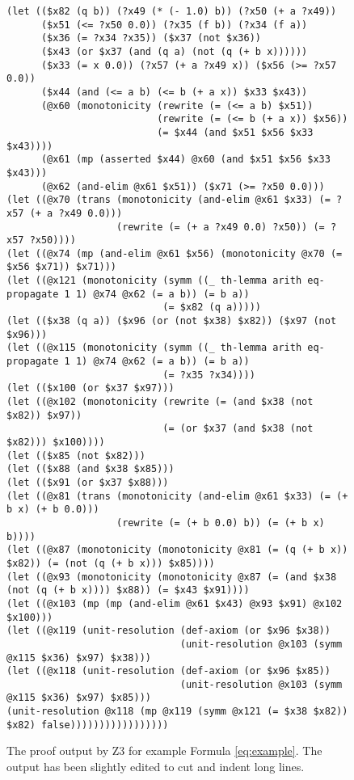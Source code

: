 \documentclass{llncs}
\begin{document}
\begin{figure}
{\scriptsize
\begin{verbatim}
(let (($x82 (q b)) (?x49 (* (- 1.0) b)) (?x50 (+ a ?x49))
      ($x51 (<= ?x50 0.0)) (?x35 (f b)) (?x34 (f a))
      ($x36 (= ?x34 ?x35)) ($x37 (not $x36))
      ($x43 (or $x37 (and (q a) (not (q (+ b x))))))
      ($x33 (= x 0.0)) (?x57 (+ a ?x49 x)) ($x56 (>= ?x57 0.0))
      ($x44 (and (<= a b) (<= b (+ a x)) $x33 $x43))
      (@x60 (monotonicity (rewrite (= (<= a b) $x51))
                          (rewrite (= (<= b (+ a x)) $x56))
                          (= $x44 (and $x51 $x56 $x33 $x43))))
      (@x61 (mp (asserted $x44) @x60 (and $x51 $x56 $x33 $x43)))
      (@x62 (and-elim @x61 $x51)) ($x71 (>= ?x50 0.0)))
(let ((@x70 (trans (monotonicity (and-elim @x61 $x33) (= ?x57 (+ a ?x49 0.0)))
                   (rewrite (= (+ a ?x49 0.0) ?x50)) (= ?x57 ?x50))))
(let ((@x74 (mp (and-elim @x61 $x56) (monotonicity @x70 (= $x56 $x71)) $x71)))
(let ((@x121 (monotonicity (symm ((_ th-lemma arith eq-propagate 1 1) @x74 @x62 (= a b)) (= b a))
                           (= $x82 (q a)))))
(let (($x38 (q a)) ($x96 (or (not $x38) $x82)) ($x97 (not $x96)))
(let ((@x115 (monotonicity (symm ((_ th-lemma arith eq-propagate 1 1) @x74 @x62 (= a b)) (= b a))
                           (= ?x35 ?x34))))
(let (($x100 (or $x37 $x97)))
(let ((@x102 (monotonicity (rewrite (= (and $x38 (not $x82)) $x97))
                           (= (or $x37 (and $x38 (not $x82))) $x100))))
(let (($x85 (not $x82)))
(let (($x88 (and $x38 $x85)))
(let (($x91 (or $x37 $x88)))
(let ((@x81 (trans (monotonicity (and-elim @x61 $x33) (= (+ b x) (+ b 0.0)))
                   (rewrite (= (+ b 0.0) b)) (= (+ b x) b))))
(let ((@x87 (monotonicity (monotonicity @x81 (= (q (+ b x)) $x82)) (= (not (q (+ b x))) $x85))))
(let ((@x93 (monotonicity (monotonicity @x87 (= (and $x38 (not (q (+ b x)))) $x88)) (= $x43 $x91))))
(let ((@x103 (mp (mp (and-elim @x61 $x43) @x93 $x91) @x102 $x100)))
(let ((@x119 (unit-resolution (def-axiom (or $x96 $x38))
                              (unit-resolution @x103 (symm @x115 $x36) $x97) $x38)))
(let ((@x118 (unit-resolution (def-axiom (or $x96 $x85))
                              (unit-resolution @x103 (symm @x115 $x36) $x97) $x85)))
(unit-resolution @x118 (mp @x119 (symm @x121 (= $x38 $x82)) $x82) false)))))))))))))))))
\end{verbatim}
}
\caption{\label{fig:proofz3} The proof output by Z3 for example Formula \ref{eq:example}. The output has been slightly edited to cut and indent long lines.}
\end{figure}
\end{document}
